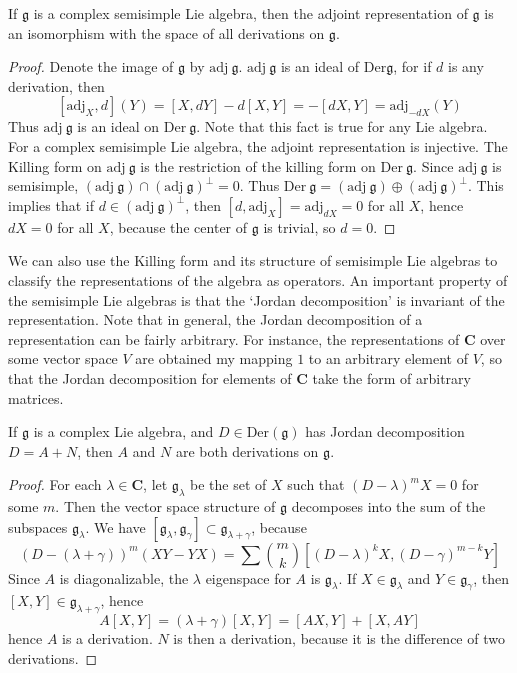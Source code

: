 \begin{theorem}
    If $\mathfrak{g}$ is a complex semisimple Lie algebra, then the adjoint representation of $\mathfrak{g}$ is an isomorphism with the space of all derivations on $\mathfrak{g}$.
\end{theorem}
\begin{proof}
    Denote the image of $\mathfrak{g}$ by $\text{adj}\ \mathfrak{g}$. $\text{adj}\ \mathfrak{g}$ is an ideal of $\text{Der} \mathfrak{g}$, for if $d$ is any derivation, then
    \[ [\text{adj}_X, d](Y) = [X,dY] - d[X,Y] = -[dX,Y] = \text{adj}_{-dX}(Y) \]
    Thus $\text{adj}\ \mathfrak{g}$ is an ideal on $\text{Der}\ \mathfrak{g}$. Note that this fact is true for any Lie algebra. For a complex semisimple Lie algebra, the adjoint representation is injective. The Killing form on $\text{adj}\ \mathfrak{g}$ is the restriction of the killing form on $\text{Der}\ \mathfrak{g}$. Since $\text{adj}\ \mathfrak{g}$ is semisimple, $(\text{adj}\ \mathfrak{g}) \cap (\text{adj}\ \mathfrak{g})^\perp = 0$. Thus $\text{Der}\ \mathfrak{g} = (\text{adj}\ \mathfrak{g}) \oplus (\text{adj}\ \mathfrak{g})^\perp$. This implies that if $d \in (\text{adj}\ \mathfrak{g})^\perp$, then $[d,\text{adj}_X] = \text{adj}_{dX} = 0$ for all $X$, hence $dX = 0$ for all $X$, because the center of $\mathfrak{g}$ is trivial, so $d = 0$.
\end{proof}

We can also use the Killing form and its structure of semisimple Lie algebras to classify the representations of the algebra as operators. An important property of the semisimple Lie algebras is that the `Jordan decomposition' is invariant of the representation. Note that in general, the Jordan decomposition of a representation can be fairly arbitrary. For instance, the representations of $\mathbf{C}$ over some vector space $V$ are obtained my mapping $1$ to an arbitrary element of $V$, so that the Jordan decomposition for elements of $\mathbf{C}$ take the form of arbitrary matrices.

\begin{lemma}
    If $\mathfrak{g}$ is a complex Lie algebra, and $D \in \text{Der}(\mathfrak{g})$ has Jordan decomposition $D = A + N$, then $A$ and $N$ are both derivations on $\mathfrak{g}$.
\end{lemma}
\begin{proof}
    For each $\lambda \in \mathbf{C}$, let $\mathfrak{g}_\lambda$ be the set of $X$ such that $(D - \lambda)^mX = 0$ for some $m$. Then the vector space structure of $\mathfrak{g}$ decomposes into the sum of the subspaces $\mathfrak{g}_\lambda$. We have $[\mathfrak{g}_\lambda, \mathfrak{g}_\gamma] \subset \mathfrak{g}_{\lambda + \gamma}$, because
    \[ (D - (\lambda + \gamma))^m(XY - YX) = \sum {m \choose k} [(D - \lambda)^k X, (D - \gamma)^{m-k} Y] \]
    Since $A$ is diagonalizable, the $\lambda$ eigenspace for $A$ is $\mathfrak{g}_\lambda$. If $X \in \mathfrak{g}_\lambda$ and $Y \in \mathfrak{g}_\gamma$, then $[X,Y] \in \mathfrak{g}_{\lambda + \gamma}$, hence
    \[ A[X,Y] = (\lambda + \gamma)[X,Y] = [AX, Y] + [X,AY] \]
    hence $A$ is a derivation. $N$ is then a derivation, because it is the difference of two derivations.
\end{proof}

